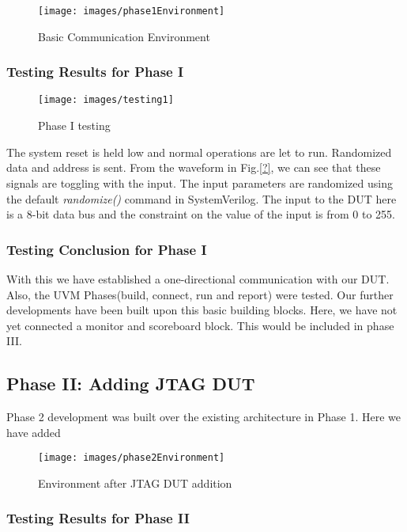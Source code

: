 \documentclass[a4paper,11pt]{article}
\begin{document}
\begin{figure}[ht]
\centering
\texttt{[image: images/phase1Environment]}
\caption{Basic Communication Environment}
\end{figure}

\subsubsection{Testing Results for Phase I}

\begin{figure}[ht]
\centering
\texttt{[image: images/testing1]}
\caption{Phase I testing}
\end{figure}

The system reset is held low and normal operations are let to run. Randomized data and address is sent. From the waveform in Fig.\ref{?}, we can see that these signals are toggling with the input. The input parameters are randomized using the default \textit{randomize()} command in SystemVerilog. The input to the DUT here is a 8-bit data bus and the constraint on the value of the input is from 0 to 255. 

\subsubsection{Testing Conclusion for Phase I}
With this we have established a one-directional communication with our DUT. Also, the UVM Phases(build, connect, run and report) were tested. Our further developments have been built upon this basic building blocks. Here, we have not yet connected a monitor and scoreboard block. This would be included in phase III.
\ \\
\FloatBarrier
\subsection{Phase II: Adding JTAG DUT}

Phase 2 development was built over the existing architecture in Phase 1. Here we have added 

\begin{figure}[ht]
\centering
\texttt{[image: images/phase2Environment]}
\caption{Environment after JTAG DUT addition}
\end{figure}

\subsubsection{Testing Results for Phase II}
\ \\
\ \\
\end{document}

